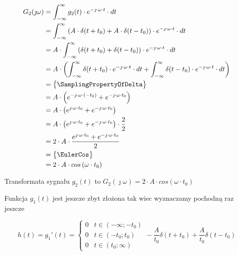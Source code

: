 \begin{task}
\begin{align*}
G_2(\jmath \omega )&=\int_{-\infty }^{\infty}g_2(t) \cdot e^{-\jmath \cdot \omega \cdot t}\cdot dt\\
&=\int_{-\infty }^{\infty}\left( A \cdot \delta(t+t_0) + A \cdot \delta(t-t_0)\right) \cdot e^{-\jmath \cdot \omega \cdot t}\cdot dt\\
&=A \cdot \int_{-\infty }^{\infty} \left( \delta(t+t_0) + \delta(t-t_0) \right) \cdot e^{-\jmath \cdot \omega \cdot t}\cdot dt\\
&=A \cdot \left( \int_{-\infty }^{\infty} \delta(t+t_0) \cdot e^{-\jmath \cdot \omega \cdot t}\cdot dt + \int_{-\infty }^{\infty} \delta(t-t_0) \cdot e^{-\jmath \cdot \omega \cdot t}\cdot dt \right)\\
&=\begin{Bmatrix}
\SamplingPropertyOfDelta
\end{Bmatrix}\\
&= A \cdot \left( e^{-\jmath \cdot \omega \cdot (-t_0)} + e^{-\jmath \cdot \omega \cdot t_0} \right)\\
&= A \cdot \left( e^{\jmath \cdot \omega \cdot t_0} + e^{-\jmath \cdot \omega \cdot t_0} \right)\\
&= A \cdot \left( e^{\jmath \cdot \omega \cdot t_0} + e^{-\jmath \cdot \omega \cdot t_0} \right) \cdot \frac{2}{2}\\
&= 2 \cdot A \cdot \frac{ e^{\jmath \cdot \omega \cdot t_0} + e^{-\jmath \cdot \omega \cdot t_0} }{2} \\
&=\begin{Bmatrix}
\EulerCos
\end{Bmatrix}\\
&= 2 \cdot A \cdot cos\left( \omega \cdot t_0\right) \\
\end{align*}

Transformata sygnału $g_2(t)$ to $G_2(\jmath \omega)=2 \cdot A \cdot cos\left( \omega \cdot t_0\right)$

Funkcja $g_1(t)$ jest jeszcze zbyt złożona tak wiec wyznaczamy pochodną raz jeszcze 

\begin{equation}
h(t)=g_1'(t)=\begin{cases}
0 & t \in \left( -\infty; -t_0 \right ) \\
0 & t \in \left( -t_0; t_0 \right ) \\
0 & t \in \left( t_0; \infty \right )
\end{cases} - \frac{A}{t_0} \delta(t+t_0) + \frac{A}{t_0} \delta(t-t_0)
\end{equation}


\end{task}
